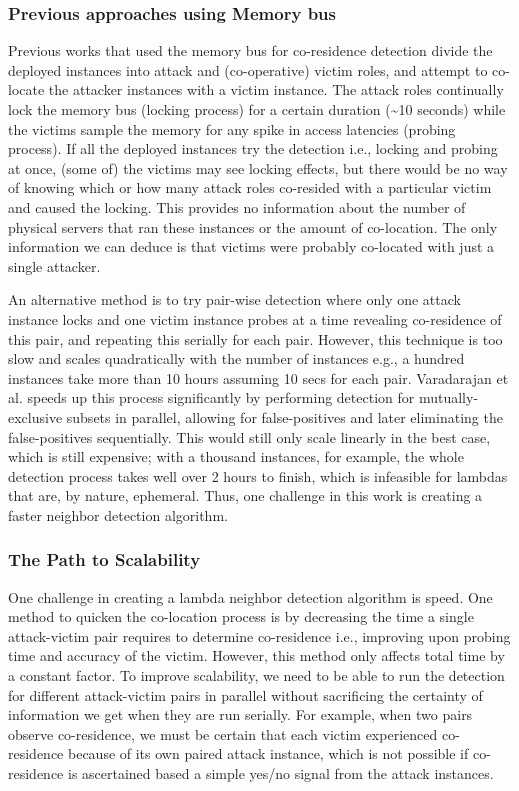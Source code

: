 \subsubsection{Previous approaches using Memory bus}
Previous works that used the memory bus for co-residence detection divide the
deployed instances into attack and (co-operative) victim roles, and attempt to
co-locate the attacker instances with a victim instance. The attack roles
continually lock the memory bus (locking process) for a certain duration
(\textasciitilde 10 seconds) while the victims sample the memory for any spike
in access latencies (probing process). If all the deployed instances try the
detection i.e., locking and probing at once, (some of) the victims may see
locking effects, but there would be no way of knowing which or how many attack
roles co-resided with a particular victim and caused the locking. This provides
no information about the number of physical servers that ran these instances or
the amount of co-location. The only information we can deduce is that victims
were probably co-located with just a single attacker.

An alternative method is to try pair-wise detection where only one attack
instance locks and one victim instance probes at a time revealing co-residence
of this pair, and repeating this serially for each pair. However, this technique
is too slow and scales quadratically with the number of instances e.g., a
hundred instances take more than 10 hours assuming 10 secs for each pair.
Varadarajan et al.\cite{varad191016} speeds up this process significantly by
performing detection for mutually-exclusive subsets in parallel, allowing for
false-positives and later eliminating the false-positives
sequentially. This would still only scale linearly in the best case, which is
still expensive; with a thousand instances, for example, the whole detection
process takes well over 2 hours to finish, which is infeasible for lambdas that
are, by nature, ephemeral. Thus, one challenge in this work is creating a faster
neighbor detection algorithm.

\subsubsection{The Path to Scalability}

One challenge in creating a lambda neighbor detection algorithm is speed. One
method to quicken the co-location process is by decreasing the time a single
attack-victim pair requires to determine co-residence i.e., improving upon
probing time and accuracy of the victim.  However, this method only affects
total time by a constant factor. To improve scalability, we need to be able to
run the detection for different attack-victim pairs in parallel without
sacrificing the certainty of information we get when they are run serially.  For
example, when two pairs observe co-residence, we must be certain that each
victim experienced co-residence because of its own paired attack instance, which
is not possible if co-residence is ascertained based a simple yes/no signal from
the attack instances. 

